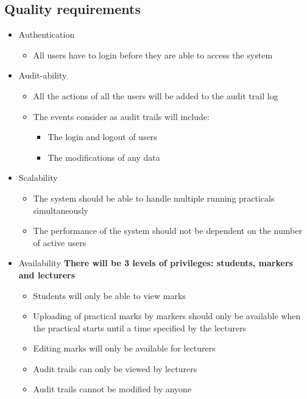 \documentclass[12pt]{article}
\begin{document}
		
		\subsection{Quality requirements}
		
			\vspace{0.2in}
			\begin{itemize}
					\item Authentication
						\begin{itemize}
							\item All users have to login before they are able to access the system
						\end{itemize}
					\item Audit-ability
						\begin{itemize}
							\item All the actions of all the users will be added to the audit trail log
							\item The events consider as audit trails will include:
							\begin{itemize}
								\item The login and logout of users
								\item The modifications of any data
							\end{itemize}
						\end{itemize}
					\item Scalability
						\begin{itemize}
							\item The system should be able to handle multiple running practicals simultaneously
							\item The performance of the system should not be dependent on the number of active users
						\end{itemize}
					\item Availability
						\textbf{There will be 3 levels of privileges: students, markers and lecturers}
						\begin{itemize}
							\item Students will only be able to view marks
							\item Uploading of practical marks by markers should only be available when the practical starts until a time specified by the lecturers
							\item Editing marks will only be available for lecturers
							\item Audit trails can only be viewed by lecturers
							\item Audit trails cannot be modified by anyone
						\end{itemize}
				\end{itemize}
			
\end{document}
